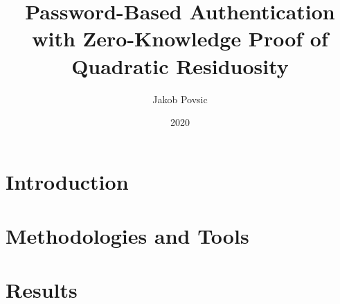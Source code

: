 \documentclass[12pt]{report}
\title{Password-Based Authentication with Zero-Knowledge Proof of Quadratic Residuosity}
\author{Jakob Povsic}
\date{2020}
\begin{document}

\maketitle
\newpage

\tableofcontents
\newpage




\chapter{Introduction}


\chapter{Methodologies and Tools}






\chapter{Results}



%


\end{document}

